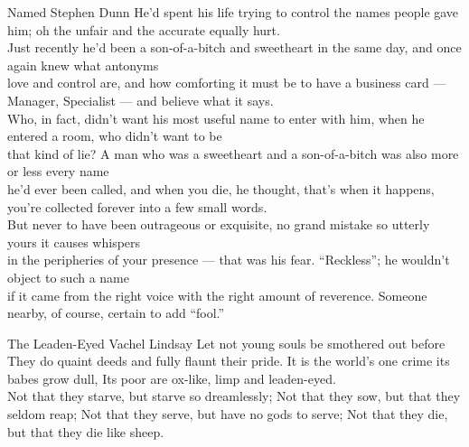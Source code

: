 \begin{poem}
{Named}
{Stephen Dunn}
He'd spent his life trying to control the names people gave him;
oh the unfair and the accurate equally hurt.\\

Just recently he'd been a son-of-a-bitch and sweetheart in the same day,
and once again knew what antonyms\\

love and control are, and how comforting it must be to have a business card ---
Manager, Specialist --- and believe what it says.\\

Who, in fact, didn't want his most useful name to enter with him,
when he entered a room, who didn't want to be\\

that kind of lie? A man who was a sweetheart and a son-of-a-bitch
was also more or less every name\\

he'd ever been called, and when you die, he thought, that's when it happens,
you're collected forever into a few small words.\\

But never to have been outrageous or exquisite, no grand mistake
so utterly yours it causes whispers\\

in the peripheries of your presence --- that was his fear.
``Reckless''; he wouldn't object to such a name\\

if it came from the right voice with the right amount of reverence.
Someone nearby, of course, certain to add ``fool.'' 
\end{poem}


\begin{poem}
{The Leaden-Eyed}
{Vachel Lindsay}
 Let not young souls be smothered out before
 They do quaint deeds and fully flaunt their pride.
 It is the world's one crime its babes grow dull,
 Its poor are ox-like, limp and leaden-eyed.\\

 Not that they starve, but starve so dreamlessly;
 Not that they sow, but that they seldom reap;
 Not that they serve, but have no gods to serve;
 Not that they die, but that they die like sheep.
\end{poem}

